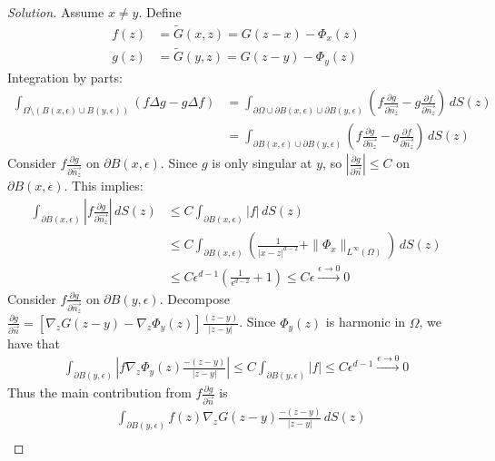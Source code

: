 \documentclass{report}
\theoremstyle{tommy}
\begin{document}
  \begin{proof}[Solution]
    Assume \(x \ne y\). Define \begin{align*}
      f(z) &= \tilde G(x,z) = G(z-x) - \Phi_x(z) \\
      g(z) &= \tilde G(y,z) = G(z-y) - \Phi_y(z)
    \end{align*}
    Integration by parts:
    \begin{align*}
      \int_{\Omega \setminus (B(x, \epsilon) \cup B(y, \epsilon))} (f \Delta g - g \Delta f) 
      &= \int_{\partial \Omega \cup \partial B(x,\epsilon) \cup \partial B(y, \epsilon)} \left(f \frac{\partial g}{\partial \vec{n_z}} - g \frac{\partial f}{\partial \vec{n_z}}\right) \, dS(z) \\
      &= \int_{\partial B(x, \epsilon) \cup \partial B(y, \epsilon)} \left(f \frac{\partial g}{\partial \vec{n_z}} - g \frac{\partial f}{\partial \vec{n_z}}\right)\, dS(z)
    \end{align*}
    Consider \(f \frac{\partial g}{\partial \vec{n_z}}\) on \(\partial B(x,\epsilon)\). Since \(g\) is only singular at \(y\), so \(\left|\frac{\partial g}{\partial \vec{n}}\right| \le C\) on \(\partial B(x,\epsilon)\). This implies:
    \begin{align*}
      \int_{\partial B(x,\epsilon)} \left|f \frac{\partial g}{\partial \vec{n_z}}\right| \, dS(z) 
      &\le C \int_{\partial B(x,\epsilon)}|f| \, dS(z) \\
      &\le C \int_{\partial B(x,\epsilon)} \left(\frac{1}{|x-z|^{d-2}} + \|\Phi_x\|_{L^\infty(\Omega)}\right) \, dS(z) \\
      &\le C \epsilon^{d-1} \left(\frac{1}{\epsilon^{d-2}} + 1\right)
      \le C\epsilon \xrightarrow{\epsilon \to 0} 0
    \end{align*}
    Consider \(f \frac{\partial g}{\partial \vec{n_z}}\) on \(\partial B(y, \epsilon)\). Decompose \(\frac{\partial g}{\partial \vec{n}} = \left[\nabla_z G(z-y) - \nabla_z \Phi_y(z)\right]\frac{(z-y)}{|z-y|}\). Since \(\Phi_y(z)\) is harmonic in \(\Omega\), we have that 
    \begin{align*}
      \int_{\partial B(y,\epsilon)} \left| f \nabla_z \Phi_y(z) \frac{-(z-y)}{|z-y|} \right|
      \le C \int_{\partial B(y,\epsilon)}|f|
      \le C \epsilon^{d-1} \xrightarrow{\epsilon \to 0}0
    \end{align*}
    Thus the main contribution from \(f \frac{\partial g}{\partial \vec{n}}\) is 
    \begin{align*}
      &\int_{\partial B(y, \epsilon)} f(z) \nabla_z G(z-y) \frac{-(z-y)}{|z-y|} \, dS(z) \\

\end{align*}
\end{proof}
\end{document}
